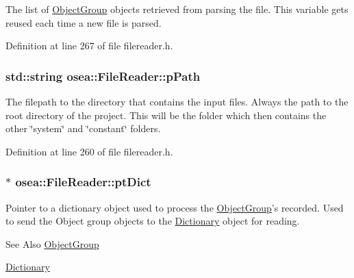 The list of \hyperlink{classosea_1_1_object_group}{Object\-Group} objects retrieved from parsing the file. This variable gets reused each time a new file is parsed. 



Definition at line 267 of file filereader.\-h.

\hypertarget{classosea_1_1_file_reader_adbc50f785e7fbbcbcf79af0f3bee49de}{
\subsubsection[{p\-Path}]{\setlength{\rightskip}{0pt plus 5cm}std\-::string osea\-::\-File\-Reader\-::p\-Path\hspace{0.3cm}{\ttfamily [protected]}}}\label{classosea_1_1_file_reader_adbc50f785e7fbbcbcf79af0f3bee49de}


The filepath to the directory that contains the input files. Always the path to the root directory of the project. This will be the folder which then contains the other \char`\"{}system\char`\"{} and \char`\"{}constant\char`\"{} folders. 



Definition at line 260 of file filereader.\-h.

\hypertarget{classosea_1_1_file_reader_a0a741388f68dbb79e3e57797e90f42f4}{
\subsubsection[{pt\-Dict}]{$\ast$ osea\-::\-File\-Reader\-::pt\-Dict\hspace{0.3cm}{\ttfamily [protected]}}}\label{classosea_1_1_file_reader_a0a741388f68dbb79e3e57797e90f42f4}


Pointer to a dictionary object used to process the \hyperlink{classosea_1_1_object_group}{Object\-Group}'s recorded. Used to send the Object group objects to the \hyperlink{classosea_1_1_dictionary}{Dictionary} object for reading. 

\begin{DoxySeeAlso}{See Also}
\hyperlink{classosea_1_1_object_group}{Object\-Group} 

\hyperlink{classosea_1_1_dictionary}{Dictionary} 
\end{DoxySeeAlso}


